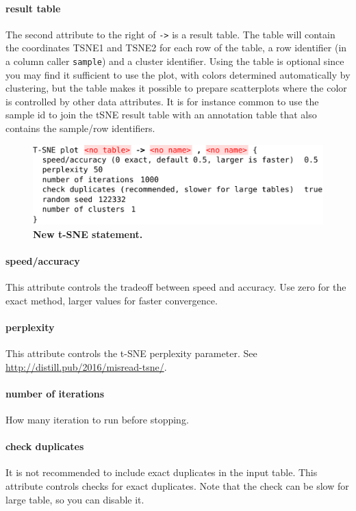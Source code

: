 \paragraph{result table}
The second attribute to the right of \texttt{->} is a result table. The table will contain the coordinates TSNE1 and TSNE2 for each row of the table, a row identifier (in a column caller \texttt{sample}) and a cluster identifier. Using the table is optional since you may find it sufficient to use the plot, with colors determined automatically by clustering, but the table makes it possible to prepare scatterplots where the color is controlled by other data attributes. It is for instance common to use the sample id to join the tSNE result table with an annotation table that also contains the sample/row identifiers.
 
\begin{figure}[bpt!]
  \centering
  \includegraphics[width=\figWidthNarrow]{figures/tSNE.pdf}
\caption[New t-SNE statement.]{\textbf{New t-SNE statement.}}
\label{fig:NewTSNE}
\end{figure}

\paragraph{speed/accuracy} This attribute controls the tradeoff between speed and accuracy. Use zero for the exact method, larger values for faster convergence.

\paragraph{perplexity} This attribute controls the t-SNE perplexity parameter. See \url{http://distill.pub/2016/misread-tsne/}.

\paragraph{number of iterations} How many iteration to run before stopping.

\paragraph{check duplicates} It is not recommended to include exact duplicates in the input table. This attribute controls checks for exact duplicates. Note that the check can be slow for large table, so you can disable it.

